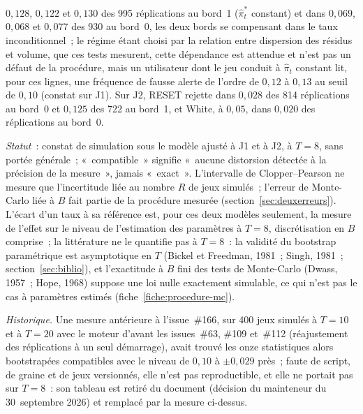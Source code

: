 \documentclass[a4paper,11pt]{article}
\begin{document}
$0{,}128$, $0{,}122$ et $0{,}130$ des 995 réplications au bord~1 ($\hat\pi^{*}_t$ constant) et
dans $0{,}069$, $0{,}068$ et $0{,}077$ des 930 au bord~0, les deux bords se compensant dans le
taux inconditionnel~; le régime étant choisi par la relation entre dispersion des résidus et
volume, que ces tests mesurent, cette dépendance est attendue et n'est pas un défaut de
la procédure, mais un utilisateur dont le jeu conduit à $\hat\pi_t$ constant lit, pour ces
lignes, une fréquence de fausse alerte de l'ordre de $0{,}12$ à $0{,}13$ au seuil de $0{,}10$
(constat sur J1). Sur J2, RESET rejette dans $0{,}028$ des 814 réplications au bord~0 et
$0{,}125$ des 722 au bord~1, et White, à $0{,}05$, dans $0{,}020$ des réplications au bord~0.

\emph{Statut}~: constat de simulation sous le modèle ajusté à J1 et à J2, à $T = 8$, sans
portée générale~; «~compatible~» signifie «~aucune distorsion détectée à la précision de la
mesure~», jamais «~exact~». L'intervalle de Clopper--Pearson ne mesure que l'incertitude liée au
nombre $R$ de jeux simulés~; l'erreur de Monte-Carlo liée à $B$ fait partie de la procédure
mesurée (section~\ref{sec:deuxerreurs}). L'écart d'un taux à sa référence est, pour ces deux
modèles seulement, la mesure de l'effet sur le niveau de l'estimation des paramètres à $T = 8$,
discrétisation en $B$ comprise~; la littérature ne le quantifie pas à $T = 8$~: la validité du
bootstrap paramétrique est asymptotique en $T$ (Bickel et Freedman, 1981~; Singh, 1981~;
section~\ref{sec:biblio}), et l'exactitude à $B$ fini des tests de Monte-Carlo (Dwass, 1957~;
Hope, 1968) suppose une loi nulle exactement simulable, ce qui n'est pas le cas à paramètres
estimés (fiche~\ref{fiche:procedure-mc}).

\emph{Historique.} Une mesure antérieure à l'issue~\#166, sur 400 jeux simulés à $T = 10$ et à
$T = 20$ avec le moteur d'avant les issues~\#63, \#109 et~\#112 (réajustement des réplications
à un seul démarrage), avait trouvé les onze statistiques alors bootstrapées compatibles avec le
niveau de $0{,}10$ à $\pm 0{,}029$ près~; faute de script, de graine et de jeux versionnés, elle
n'est pas reproductible, et elle ne portait pas sur $T = 8$~: son tableau est retiré du document
(décision du mainteneur du 30~septembre 2026) et remplacé par la mesure ci-dessus.
\end{document}

